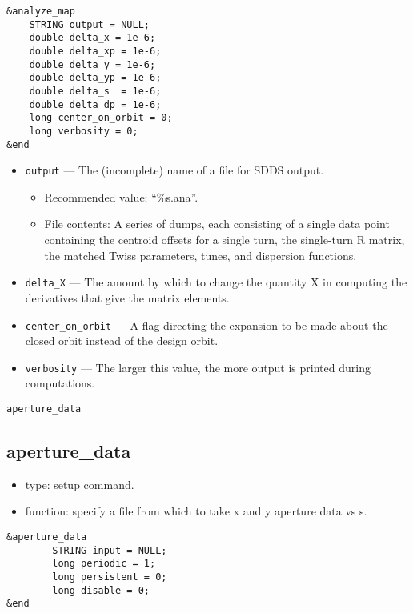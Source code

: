 \documentclass[11pt]{article}
\begin{document}
\begin{verbatim}
&analyze_map
    STRING output = NULL;
    double delta_x = 1e-6;
    double delta_xp = 1e-6;
    double delta_y = 1e-6;
    double delta_yp = 1e-6;
    double delta_s  = 1e-6;
    double delta_dp = 1e-6;
    long center_on_orbit = 0;
    long verbosity = 0;
&end
\end{verbatim}

\begin{itemize}
\item \verb|output| --- The (incomplete) name of a file for SDDS output.
    \begin{itemize}
    \item Recommended value: ``\%s.ana''.
    \item File contents:  A series of dumps, each consisting of a single data point containing
        the centroid offsets for a single turn, the single-turn R matrix, the matched Twiss parameters, tunes, and 
        dispersion functions.
    \end{itemize}
\item \verb|delta_X| --- The amount by which to change the quantity X in computing the derivatives that give the matrix elements.
\item \verb|center_on_orbit| --- A flag directing the expansion to be made about the closed orbit instead of the design orbit.
\item \verb|verbosity| --- The larger this value, the more output is printed during computations.
\end{itemize}

\begin{latexonly}
\newpage
\begin{center}{\Large\verb|aperture_data|}\end{center}
\end{latexonly}
\subsection{aperture\_data \label{subsec:aperturedata}}

\begin{itemize}
\item type: setup command.
\item function: specify a file from which to take x and y aperture data vs s.
\end{itemize}

\begin{verbatim}
&aperture_data
        STRING input = NULL;
        long periodic = 1; 
        long persistent = 0;
        long disable = 0;
&end
\end{verbatim}
\end{document}
